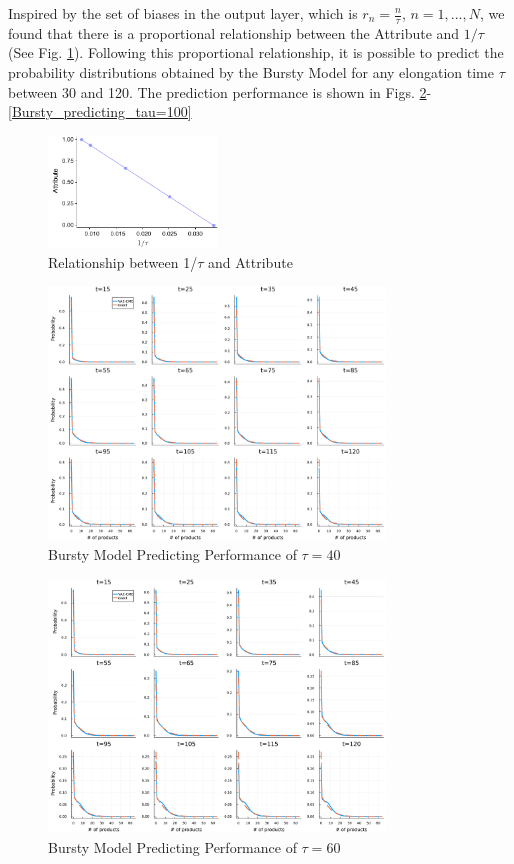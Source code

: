 \documentclass[a4paper,10pt]{article}
\begin{document}
\newpage
Inspired by the set of biases in the output layer, which is $r_n=\frac{n}{\tau}$\cite{jiang2021neural}, $n=1,...,N$, we found that there is a proportional relationship between the Attribute and $1/\tau$ (See Fig. \ref{tau_Attribute}). Following this proportional relationship, it is possible to predict the probability distributions obtained by the Bursty Model for any elongation time $\tau$ between 30 and 120. The prediction performance is shown in Figs. \ref{Bursty_predicting_tau=40}-\ref{Bursty_predicting_tau=100}
\begin{figure}[h]
	\centering
	\includegraphics[width=0.4\textwidth]{Figs/tau_Attribute.pdf}
	\caption{Relationship between 1/$\tau$ and Attribute}\label{tau_Attribute}  
\end{figure}
\begin{figure}[h]
	\centering
	\includegraphics[width=0.8\textwidth]{Figs/Bursty_predicting_tau=40.pdf}
	\caption{Bursty Model Predicting Performance of $\tau=40$}\label{Bursty_predicting_tau=40}  
\end{figure}
\begin{figure}[h]
	\centering
	\includegraphics[width=0.8\textwidth]{Figs/Bursty_predicting_tau=60.pdf}
	\caption{Bursty Model Predicting Performance of $\tau=60$}\label{Bursty_predicting_tau=60}  
\end{figure}
\end{document}
